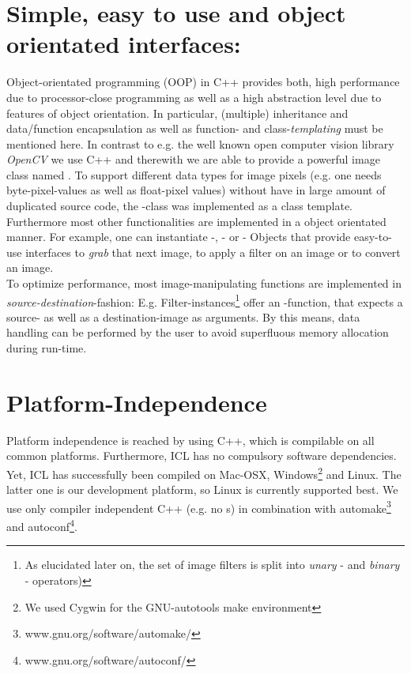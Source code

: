 \section{Simple, easy to use and object orientated interfaces:}
Object-orientated programming (OOP) in C++ provides both, high performance due to processor-close programming as well as a high abstraction level due to features of object orientation. In particular, (multiple) inheritance and data/function encapsulation as well as function- and class-\emph{templating} must be mentioned here. In contrast to e.g. the well known open computer vision library \emph{OpenCV} we use C++ and therewith we are able to provide a powerful image class named  . To support different data types for image pixels (e.g. one needs byte-pixel-values as well as float-pixel values) without have in large amount of duplicated source code, the -class was implemented as a class template.\\
Furthermore most other functionalities are implemented in a object orientated manner. For example, one can instantiate   -,  - or  - Objects that provide easy-to-use interfaces to \emph{grab} that next image, to apply a filter on an image or to convert an image.\\
To optimize performance, most image-manipulating functions are implemented in \emph{source-destination}-fashion: E.g. Filter-instances\footnote{As elucidated later on, the set of image filters is split into \emph{unary} - and \emph{binary} - operators)} offer an -function, that expects a source- as well as a destination-image as arguments. By this means, data handling can be performed by the user to avoid superfluous memory allocation during run-time. 


\section{Platform-Independence}
Platform independence is reached by using C++, which is compilable on all common platforms. Furthermore, ICL has no compulsory software dependencies. Yet, ICL has successfully been compiled on Mac-OSX, Windows\footnote{We used Cygwin for the GNU-autotools make environment} and Linux. The latter one is our development platform, so Linux is currently supported best. We use only compiler independent C++ (e.g. no s) in combination with automake\footnote{www.gnu.org/software/automake/} and autoconf\footnote{www.gnu.org/software/autoconf/}.  

